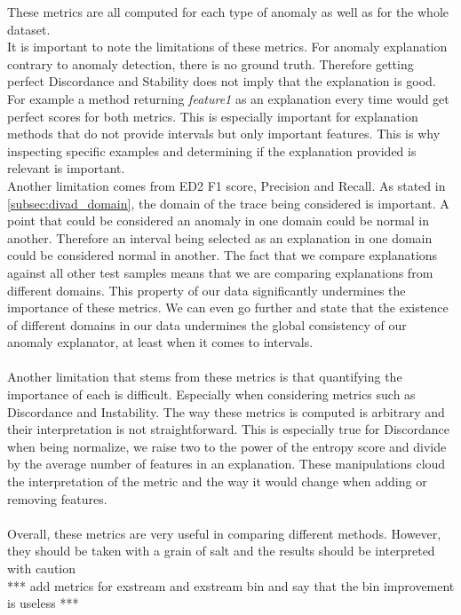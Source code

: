 \documentclass[oneside, a4paper, onecolumn, 11pt]{article}
\begin{document}
These metrics are all computed for each type of anomaly as well as for the whole dataset.\\
It is important to note the limitations of these metrics. For anomaly explanation contrary to anomaly detection, there is no ground truth. Therefore getting perfect Discordance and Stability does not imply that the explanation is good. For example a method returning \textit{feature1} as an explanation every time would get perfect scores for both metrics. This is especially important for explanation methods that do not provide intervals but only important features. This is why inspecting specific examples and determining if the explanation provided is relevant is important.\\
Another limitation comes from ED2 F1 score, Precision and Recall. As stated in \autoref{subsec:divad_domain}, the domain of the trace being considered is important. A point that could be considered an anomaly in one domain could be normal in another. Therefore an interval being selected as an explanation in one domain could be considered normal in another. The fact that we compare explanations against all other test samples means that we are comparing explanations from different domains. This property of our data significantly undermines the importance of these metrics.
We can even go further and state that the existence of different domains in our data undermines the global consistency of our anomaly explanator, at least when it comes to intervals.\\\\
Another limitation that stems from these metrics is that quantifying the importance of each is difficult. Especially when considering metrics such as Discordance and Instability. The way these metrics is computed is arbitrary and their interpretation is not straightforward. This is especially true for Discordance when being normalize, we raise two to the power of the entropy score and divide by the average number of features in an explanation. These manipulations cloud the interpretation of the metric and the way it would change when adding or removing features.\\\\
Overall, these metrics are very useful in comparing different methods. However, they should be taken with a grain of salt and the results should be interpreted with caution\\  
*** add metrics for exstream and exstream bin and say that the bin improvement is useless ***
\end{document}
